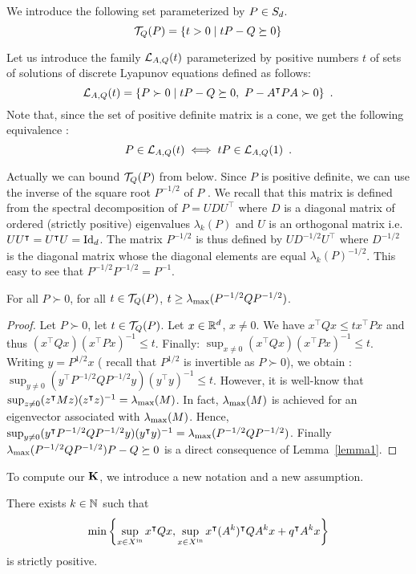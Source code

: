 \documentclass[10pt]{article}
\begin{document}

We introduce the following set parameterized by $P\in S_d$.
\[
\mathcal{T}_{Q}(P)=\{t>0\mid tP-Q\succeq 0\}
\]

Let us introduce the family $\mathcal{L}_{A,Q}(t)$ parameterized by positive numbers $t$ of sets of solutions of discrete Lyapunov equations defined as follows:
\[
\lyat{A,Q}=\{P\succ 0\mid tP-Q\succeq 0,\ P-A^\intercal P A\succ 0\}\enspace. 
\]
Note that, since the set of positive definite matrix is a cone, we get the following equivalence :
\begin{equation}
\label{simpleequiv}
P\in\mathcal{L}_{A,Q}(t)\iff tP\in\mathcal{L}_{A,Q}(1)\enspace.
\end{equation}
 
Actually we can bound $\mathcal{T}_{Q}(P)$ from below. Since $P$ is positive definite, we can use the inverse of the square root $P^{-1/2}$ of $P$ . We recall that this matrix is defined from the spectral decomposition of $P=U D U^\intercal$ where $D$ is a diagonal  matrix of ordered (strictly positive) eigenvalues $\lambda_k(P)$ and $U$ is an orthogonal matrix i.e. $U U^\intercal = U^\intercal U=\operatorname{Id}_d$.   The matrix  $P^{-1/2}$ is thus defined by 
$U D^{-1/2} U^\intercal$ where $D^{-1/2}$ is the diagonal matrix whose the diagonal elements are equal $\lambda_k(P)^{-1/2}$. This easy to see that $P^{-1/2} P^{-1/2}=P^{-1}$. 

\begin{prop}
\label{propcont}
For all $P\succ 0$, for all $t\in\mathcal{T}_{Q}(P)$, $t\geq \lambda_{\operatorname{max}}(P^{-1/2} Q P^{-1/2})$.
\end{prop}
\begin{proof}
Let $P\succ 0$, let $t\in\mathcal{T}_{Q}(P)$. Let $x\in\mathbb R^d$, $x\neq 0$. We have 
$x^\intercal Q x\leq t x^\intercal P x$ and thus $(x^\intercal Q x)(x^\intercal P x)^{-1}\leq t$. Finally:
$\sup_{x\neq 0}(x^\intercal Q x)(x^\intercal P x)^{-1}\leq t $. Writing $y=P^{1/2}x$ ( recall that $P^{1/2}$ is invertible as $P\succ 0$), we obtain :
$\sup_{y\neq 0}(y^\intercal P^{-1/2}Q P^{-1/2}y)(y^\intercal y)^{-1}\leq t $. However, it is well-know that
$\sup_{z\neq 0} (z^\intercal M z)(z^\intercal z)^{-1}=\lambda_{\operatorname{max}}(M)$. In fact, $\lambda_{\operatorname{max}}(M)$ is achieved for an eigenvector associated with $\lambda_{\operatorname{max}}(M)$. Hence, 
$\sup_{y\neq 0} (y^\intercal P^{-1/2}Q P^{-1/2}y)(y^\intercal y)^{-1}=\lambda_{\operatorname{max}}(P^{-1/2} Q P^{-1/2})$. Finally $\lambda_{\operatorname{max}}(P^{-1/2} Q P^{-1/2})P-Q\succeq 0$ is a direct consequence of Lemma~\ref{lemma1}. 

\end{proof}
To compute our $\mathbf{K}$, we introduce a new notation and a new assumption. 
 \begin{assumption}
\label{assumR}
There exists $k\in\mathbb{N}$ such that\[\min\left\{\sup_{x\in X^\mathrm{in}} x^\intercal Q x , \sup_{x\in X^\mathrm{in}} x^\intercal (A^k)^\intercal Q A^k x+q^\intercal A^k x\right\}\] is strictly positive.
\end{assumption}
\end{document}
